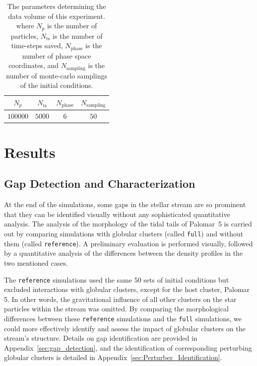 \documentclass[draft]{aa}
\begin{document}
    \begin{table}[h]
      \centering
      \begin{tabular}{|c|c|c|c|}
          \hline
          $N_p$ & $N_{\textrm{ts}}$ & $N_{\textrm{phase}}$ & $N_{\textrm{sampling}}$ \\
          \hline
          $100000$ & $5000$ & $6$ & $50$ \\
          \hline
      \end{tabular}
      \caption{The parameters determining the data volume of this experiment. where $N_p$  is the number of particles, $N_{\textrm{ts}}$ is the number of time-steps saved, $N_{\textrm{phase}}$ is the number of phase space coordinates, and $N_{\textrm{sampling}}$ is the number of monte-carlo samplings of the initial conditions.}
      \label{tab:data_volume}
  \end{table}







\section{Results}

  \subsection{Gap Detection and Characterization} \label{sec:gap_methods}

    At the end of the simulations, some gaps in the stellar stream are so prominent that they can be identified visually without any sophisticated quantitative analysis. The analysis of the morphology of the tidal tails of Palomar~5 is carried out by comparing simulations with globular clusters (called \texttt{full}) and without them (called \texttt{reference}). A preliminary evaluation is performed visually, followed by a quantitative analysis of the differences between the density profiles in the two mentioned cases. 


    The \texttt{reference} simulations used the same 50 sets of initial conditions but excluded interactions with globular clusters, except for the host cluster, Palomar 5. In other words, the gravitational influence of all other clusters on the star particles within the stream was omitted. By comparing the morphological differences between these \texttt{reference} simulations and the \texttt{full} simulations, we could more effectively identify and assess the impact of globular clusters on the stream's structure. Details on gap identification are provided in Appendix~\ref{sec:gap_detection}, and the identification of corresponding perturbing globular clusters is detailed in Appendix~\ref{sec:Perturber_Identification}.
\end{document}

